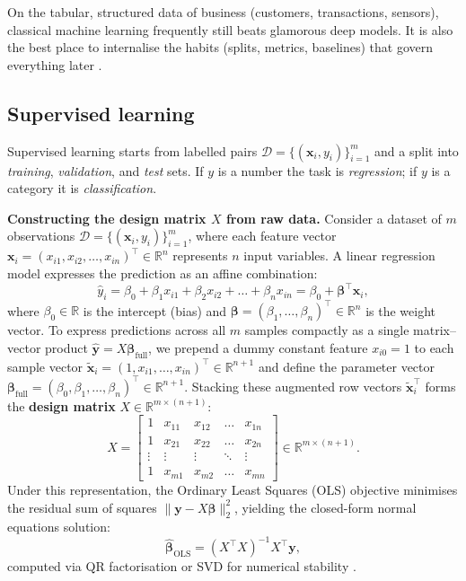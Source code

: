 \documentclass[11pt,a4paper]{article}
\begin{document}
	On the tabular, structured data of business (customers, transactions,
	sensors), classical machine learning frequently still beats glamorous
	deep models. It is also the best place to internalise the habits 
	(splits, metrics, baselines)  that govern everything later
	\parencite{hastie2009, pedregosa2011}.
	
	\subsection{Supervised learning}
	
	Supervised learning starts from labelled pairs
	$\mathcal{D} = \{(\mathbf{x}_i, y_i)\}_{i=1}^{m}$ and a split into
	\emph{training}, \emph{validation}, and \emph{test} sets. If $y$ is a
	number the task is \emph{regression}; if $y$ is a category it is
	\emph{classification}.
	
	\textbf{Constructing the design matrix $X$ from raw data.} Consider a dataset of $m$ observations $\mathcal{D} = \{(\mathbf{x}_i, y_i)\}_{i=1}^{m}$, where each feature vector $\mathbf{x}_i = (x_{i1}, x_{i2}, \dots, x_{in})^{\!\top} \in \mathbb{R}^n$ represents $n$ input variables. A linear regression model expresses the prediction as an affine combination:
	\begin{equation}
		\hat{y}_i = \beta_0 + \beta_1 x_{i1} + \beta_2 x_{i2} + \dots + \beta_n x_{in} = \beta_0 + \boldsymbol{\beta}^{\!\top}\mathbf{x}_i,
	\end{equation}
	where $\beta_0 \in \mathbb{R}$ is the intercept (bias) and $\boldsymbol{\beta} = (\beta_1, \dots, \beta_n)^{\!\top} \in \mathbb{R}^n$ is the weight vector. To express predictions across all $m$ samples compactly as a single matrix--vector product $\hat{\mathbf{y}} = X\boldsymbol{\beta}_{\text{full}}$, we prepend a dummy constant feature $x_{i0} = 1$ to each sample vector $\tilde{\mathbf{x}}_i = (1, x_{i1}, \dots, x_{in})^{\!\top} \in \mathbb{R}^{n+1}$ and define the parameter vector $\boldsymbol{\beta}_{\text{full}} = (\beta_0, \beta_1, \dots, \beta_n)^{\!\top} \in \mathbb{R}^{n+1}$. Stacking these augmented row vectors $\tilde{\mathbf{x}}_i^{\!\top}$ forms the \textbf{design matrix} $X \in \mathbb{R}^{m \times (n+1)}$:
	\begin{equation}
		X = \begin{bmatrix}
			1 & x_{11} & x_{12} & \dots & x_{1n} \\
			1 & x_{21} & x_{22} & \dots & x_{2n} \\
			\vdots & \vdots & \vdots & \ddots & \vdots \\
			1 & x_{m1} & x_{m2} & \dots & x_{mn}
		\end{bmatrix} \in \mathbb{R}^{m \times (n+1)}.
	\end{equation}
	Under this representation, the Ordinary Least Squares (OLS) objective minimises the residual sum of squares $\|\mathbf{y} - X\boldsymbol{\beta}\|_2^2$, yielding the closed-form normal equations solution:
	\begin{equation}
		\hat{\boldsymbol{\beta}}_{\text{OLS}} = (X^{\!\top}X)^{-1}X^{\!\top}\mathbf{y},
	\end{equation}
	computed via QR factorisation or SVD for numerical stability \parencite{strang2012linear, strang2019}.
	
\end{document}
